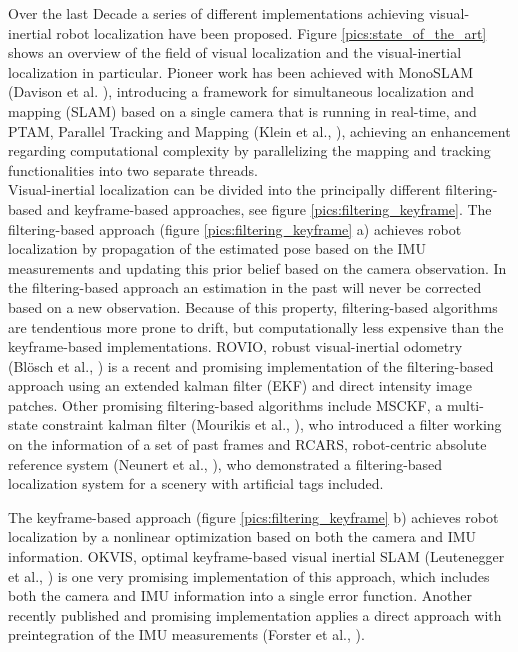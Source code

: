 Over the last Decade a series of different implementations achieving visual-inertial robot localization have been proposed. Figure \ref{pics:state_of_the_art} shows an overview of the field of visual localization and the visual-inertial localization in particular. Pioneer work has been achieved with MonoSLAM (Davison et al. \cite{davison2007monoslam}), introducing a framework for simultaneous localization and mapping (SLAM) based on a single camera that is running in real-time, and PTAM, Parallel Tracking and Mapping (Klein et al., \cite{klein2007parallel}), achieving an enhancement regarding computational complexity by parallelizing the mapping and tracking functionalities into two separate threads. \\

Visual-inertial localization can be divided into the principally different filtering-based and keyframe-based approaches,  see figure \ref{pics:filtering_keyframe}. The filtering-based approach (figure \ref{pics:filtering_keyframe} a) achieves robot localization by propagation of the estimated pose based on the IMU measurements and updating this prior belief based on the camera observation. In the filtering-based approach an estimation in the past will never be corrected based on a new observation. Because of this property, filtering-based algorithms are tendentious more prone to drift, but computationally less expensive than the keyframe-based implementations. ROVIO, robust visual-inertial odometry (Blösch et al., \cite{bloeschrobust}) is a recent and promising implementation of the filtering-based approach using an extended kalman filter (EKF) and direct intensity image patches. Other promising filtering-based algorithms include MSCKF, a multi-state constraint kalman filter (Mourikis et al., \cite{mourikis2007multi}), who introduced a filter working on the information of a set of past frames and RCARS, robot-centric absolute reference system (Neunert et al., \cite{neunert2015open}), who demonstrated a filtering-based localization system for a scenery with artificial tags included.

The keyframe-based approach (figure \ref{pics:filtering_keyframe} b) achieves robot localization by a nonlinear optimization based on both the camera and IMU information. OKVIS, optimal keyframe-based visual inertial SLAM (Leutenegger et al., \cite{leutenegger2015keyframe}) is one very promising implementation of this approach, which includes both the camera and IMU information into a single error function. Another recently published and promising implementation applies a direct approach with preintegration of the IMU measurements (Forster et al., \cite{forster2015imu}).

